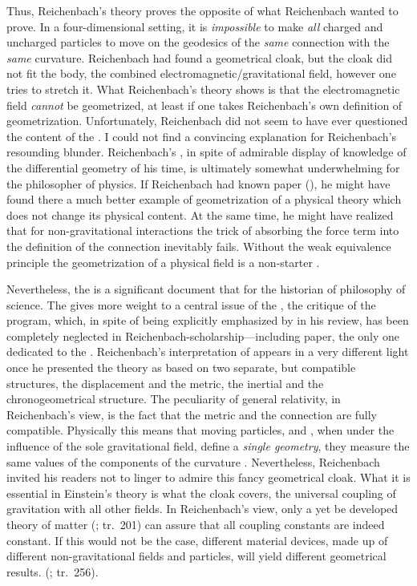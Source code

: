 \documentclass[submitted]{article}
\newcommand{\PRZL}{\citetitle{Reichenbach1928}\xspace}
\renewcommand{\rzlp}[2]{(\cite[#1]{Reichenbach1928}; tr.\ #2)\xspace}
\begin{document}
Thus, Reichenbach's theory proves the opposite of what Reichenbach wanted to prove. In a four-dimensional setting, it is \emph{impossible} to make \emph{all} charged and uncharged particles to move on the geodesics of the \emph{same} connection with the \emph{same} curvature. Reichenbach had found a geometrical cloak, but the cloak did not fit the body, the combined electromagnetic/gravitational field, however one tries to stretch it. What Reichenbach's theory shows is that the electromagnetic field \emph{cannot} be geometrized, at least if one takes Reichenbach's own definition of geometrization. Unfortunately, Reichenbach did not seem to have ever questioned the content of the \Ap \citep{Einstein1928a,Einstein1929b}. I could not find a convincing explanation for Reichenbach's resounding blunder. Reichenbach's \Ap, in spite of admirable display of knowledge of the differential geometry of his time, is ultimately somewhat underwhelming for the philosopher of physics. If Reichenbach had known  paper (), he might have found there a much better example of geometrization of a physical theory which does not change its physical content. At the same time, he might have realized that for non-gravitational interactions the trick of absorbing the force term into the definition of the connection inevitably fails. Without the weak equivalence principle the geometrization of a physical field is a non-starter \citep[see, however]{Droz-Vincent1967}.

Nevertheless, the \Ap is a significant document that for the historian of philosophy of science. The \Ap gives more weight to a central issue of the \PRZL, the critique of the  program, which, in spite of being explicitly emphasized by \citet{Einstein1928d} in his review, has been completely neglected in Reichenbach-scholarship---including  paper, the only one dedicated to the \Ap. Reichenbach's interpretation of \gr appears in a very different light once he presented the theory as based on two separate, but compatible structures, the displacement and the metric, the inertial and the chronogeometrical structure. The peculiarity of general relativity, in Reichenbach's view, is the fact that the metric and the connection are fully compatible. Physically this means that moving particles, and \rac, when under the influence of the sole gravitational field, define a \emph{single geometry}, they measure the same values of the components of the curvature \rite. Nevertheless, Reichenbach invited his readers not to linger to admire this fancy geometrical cloak. What it is essential in Einstein's theory is what the cloak covers, the universal coupling of gravitation with all other fields. In Reichenbach's view, only a yet be developed theory of matter \rzlp{233}{201} can assure that all coupling constants are indeed constant. If this would not be the case, different material devices, made up of different non-gravitational fields and particles, will yield different geometrical results.  \rzlp{295}{256}.
\end{document}
